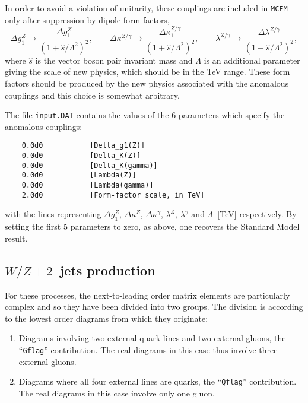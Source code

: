 \documentclass[12pt]{article}
\begin{document}
In order to avoid a violation of unitarity, these couplings are included
in {\tt MCFM} only after suppression by dipole form factors,
\begin{displaymath}
\Delta g_1^Z \rightarrow \frac{\Delta g_1^Z}{(1+\hat{s}/\Lambda^2)^2}, \qquad
\Delta \kappa^{Z/\gamma} \rightarrow
 \frac{\Delta \kappa_1^{Z/\gamma}}{(1+\hat{s}/\Lambda^2)^2}, \qquad
\lambda^{Z/\gamma} \rightarrow
 \frac{\Delta \lambda^{Z/\gamma}}{(1+\hat{s}/\Lambda^2)^2},
\end{displaymath}
where $\hat{s}$ is the vector boson pair invariant mass and $\Lambda$
is an additional parameter giving the scale of new physics, which should
be in the TeV range.
These form factors should be produced by the new physics associated with the
anomalous couplings and this choice is somewhat arbitrary.

The file {\tt input.DAT} contains the values of the $6$ parameters
which specify the anomalous couplings:
\begin{verbatim}
    0.0d0           [Delta_g1(Z)]
    0.0d0           [Delta_K(Z)]
    0.0d0           [Delta_K(gamma)]
    0.0d0           [Lambda(Z)]
    0.0d0           [Lambda(gamma)]
    2.0d0           [Form-factor scale, in TeV]
\end{verbatim}
with the lines representing $\Delta g_1^Z$, $\Delta \kappa^Z$,
$\Delta \kappa^\gamma$, $\lambda^Z$, $\lambda^\gamma$ and
$\Lambda$~[TeV] respectively. By setting the first 5 parameters to zero,
as above, one recovers the Standard Model result.

\subsection{$W/Z+2$~jets production}
\label{subsec:v2j}

For these processes, the next-to-leading order matrix elements are
particularly complex and so they have been divided into two groups.
The division is according to the lowest order diagrams from which they
originate:
\begin{enumerate}
\item Diagrams involving two external quark lines and two external gluons,
the ``{\tt Gflag}'' contribution. The real diagrams in this case thus
involve three external gluons.

\item Diagrams where all four external lines are quarks,
the ``{\tt Qflag}'' contribution. The real diagrams in this case 
involve only one gluon.
\end{enumerate}
\end{document}
